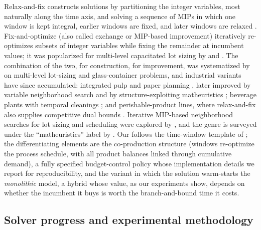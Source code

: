 Relax-and-fix constructs solutions by partitioning the integer
variables, most naturally along the time axis, and solving a
sequence of MIPs in which one window is kept integral, earlier windows
are fixed, and later windows are relaxed
\citep{dillenberger1994practical,pochet2006production}.
Fix-and-optimize (also called exchange or MIP-based improvement)
iteratively re-optimizes subsets of integer variables while fixing the
remainder at incumbent values; it was popularized for multi-level
capacitated lot sizing by \citet{sahling2009solving} and
\citet{helber2010fix}. The combination of the two, \RF{} for
construction, \FO{} for improvement, was systematized by
\citet{toledo2015relax} on multi-level lot-sizing and glass-container
problems, and industrial variants have since accumulated: integrated
pulp and paper planning \citep{santos2012integrated}, later improved
by variable neighborhood search \citep{figueira2013hybrid} and by
structure-exploiting matheuristics \citep{furlan2024matheuristic};
beverage plants with temporal cleanings \citep{toscano2020formulation};
and perishable-product lines, where relax-and-fix also supplies
competitive dual bounds \citep{jors2021perishable}. Iterative
MIP-based neighborhood searches for lot sizing and scheduling were
explored by \citet{james2011single}, and the genre is surveyed under
the ``matheuristics'' label by \citet{fischetti2018matheuristics}.
Our \RFFO{} follows the time-window template of
\citet{toledo2015relax}; the differentiating elements are the
co-production structure (windows re-optimize the process schedule,
with all product balances linked through cumulative demand), a fully
specified budget-control policy whose implementation details we report
for reproducibility, and the \RFMIP{} variant in which the \RF{}
solution warm-starts the \emph{monolithic} model, a hybrid whose
value, as our experiments show, depends on whether the incumbent it
buys is worth the branch-and-bound time it costs.

\subsection{Solver progress and experimental methodology}
\label{sec:rw-methodology}

